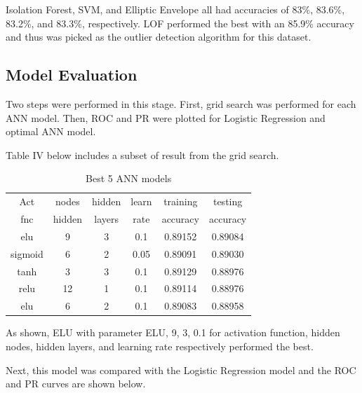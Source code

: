 \documentclass[letterpaper, 12 pt, conference]{ieeeconf}  %
\begin{document}
Isolation Forest, SVM, and Elliptic Envelope all had accuracies of 83\%, 83.6\%, 83.2\%, and 83.3\%, respectively. LOF performed the best with an 85.9\% accuracy and thus was picked as the outlier detection algorithm for this dataset. 

\subsection{Model Evaluation}

Two steps were performed in this stage. First, grid search was performed for each ANN model. Then, ROC and PR were plotted for Logistic Regression and optimal ANN model.

Table IV below includes a subset of result from the grid search. 
\begin{table}[H]
        \centering
        \caption{Best 5 ANN models} 
        \begin{tabular}{cccccc}
        \toprule
        Act     & nodes  & hidden & learn & training & testing  \\
        fnc     & hidden & layers & rate  & accuracy & accuracy \\
        \midrule                  
        elu     & 9      & 3      & 0.1   & 0.89152  & 0.89084 \\
        sigmoid & 6      & 2      & 0.05  & 0.89091  & 0.89030 \\
        tanh    & 3      & 3      & 0.1   & 0.89129  & 0.88976 \\
        relu    & 12     & 1      & 0.1   & 0.89114  & 0.88976 \\
        elu     & 6      & 2      & 0.1   & 0.89083  & 0.88958 \\
        \bottomrule
        \end{tabular}
        \end{table}

\noindent As shown, ELU with parameter ELU, 9, 3, 0.1 for activation function, hidden nodes, hidden layers, and learning rate respectively performed the best.

Next, this model was compared with the Logistic Regression model and the ROC and PR curves are shown below.
\end{document}
